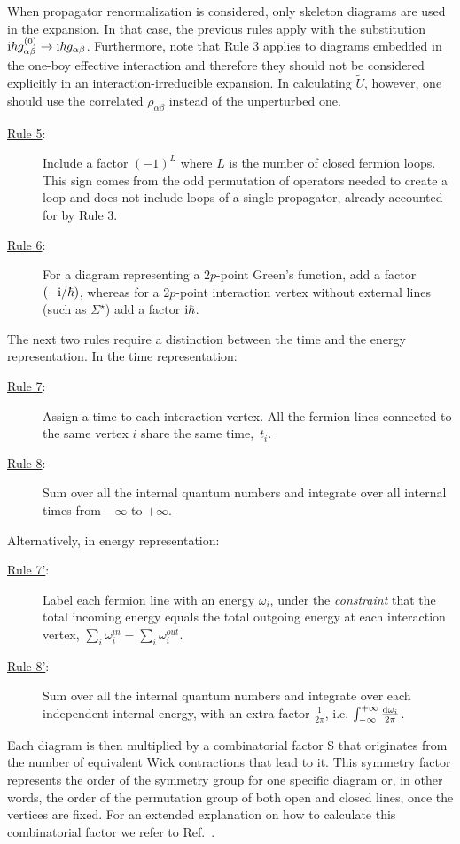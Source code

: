 When propagator renormalization is considered, only skeleton diagrams are used in the 
expansion. In that case, the previous rules apply with the substitution 
${\rm i} \hbar g_{\alpha\beta}^{(0)} \to 
{\rm i} \hbar g_{\alpha\beta}$.
Furthermore, note that  Rule 3 applies to diagrams embedded 
in the one-boy effective interaction 
 and therefore they should not be considered explicitly in
an interaction-irreducible expansion. 
In calculating $\tilde U$, however, 
one should use the correlated $\rho_{\alpha\beta}$ instead of the unperturbed one. 
\begin{description}
\item[\underline{Rule 5}:] Include a factor $(-1)^{L}$ where $L$ is the number of closed fermion loops. This sign comes from the odd permutation of  operators needed to create a loop
and does not include loops of a single propagator, already accounted for by Rule 3.
\item[\underline{Rule 6}:] For a diagram representing a $2p$-point Green's function, add a factor $(-{\rm i}/\hbar)$, whereas for a $2p$-point interaction vertex without external lines (such as $\Sigma^\star$) add a factor ${\rm i}\hbar$.
\end{description}
The next two rules require a distinction between the time and the energy representation. 
In the time representation:
\begin{description}
\item[\underline{Rule 7}:] Assign a time to each interaction vertex. All the fermion lines connected to the same vertex $i$ share the same time,~$t_i$. 
\item[\underline{Rule 8}:] Sum over all the internal quantum numbers and integrate over all internal times from $-\infty$ to $+\infty$. 
\end{description}
Alternatively, in energy representation:
\begin{description}
\item[\underline{Rule 7'}:]  Label each fermion line with an energy $\omega_i$, 
under the \emph{constraint} that the total incoming energy equals the total outgoing energy at 
each interaction vertex, \hbox{$\sum_i\omega_i^{in}=\sum_i\omega_i^{out}$}.
\item[\underline{Rule 8'}:] Sum over all the internal quantum numbers and integrate over each independent internal energy, with an extra factor $\frac{1}{2\pi}$, i.e. $\int^{+\infty}_{-\infty} \frac{{\rm d}\omega_i}{2\pi}$.
\end{description}
Each diagram is then multiplied by a combinatorial factor S that  originates from the number of 
equivalent Wick contractions that lead to it. This symmetry factor 
represents the order of the symmetry group for one specific diagram or, in other words, 
the order of the permutation group of both open and closed lines, once the vertices are fixed. For an extended explanation on how to calculate this combinatorial factor we refer to Ref.~\cite{Carbone2013Nov}.












